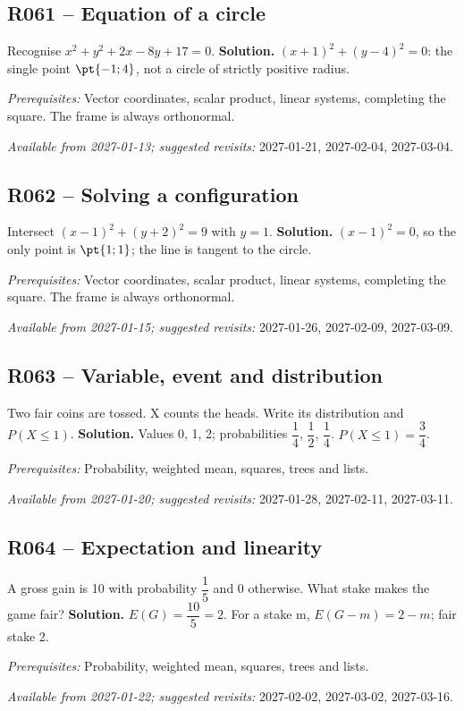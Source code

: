 \subsection*{R061 -- Equation of a circle}\label{R061}
Recognise $x^2+y^2+2x-8y+17=0$.
\ifmxteacher\textbf{Solution.} $(x+1)^2+(y-4)^2=0$: the single point $\pt{-1;4}$, not a circle of strictly positive radius.\par\textit{Prerequisites:} Vector coordinates, scalar product, linear systems, completing the square. The frame is always orthonormal.\par\textit{Available from 2027-01-13; suggested revisits:} 2027-01-21, 2027-02-04, 2027-03-04.\fi
{}\subsection*{R062 -- Solving a configuration}\label{R062}
Intersect $(x-1)^2+(y+2)^2=9$ with $y=1$.
\ifmxteacher\textbf{Solution.} $(x-1)^2=0$, so the only point is $\pt{1;1}$; the line is tangent to the circle.\par\textit{Prerequisites:} Vector coordinates, scalar product, linear systems, completing the square. The frame is always orthonormal.\par\textit{Available from 2027-01-15; suggested revisits:} 2027-01-26, 2027-02-09, 2027-03-09.\fi
{}\subsection*{R063 -- Variable, event and distribution}\label{R063}
Two fair coins are tossed. X counts the heads. Write its distribution and $P(X\leq1)$.
\ifmxteacher\textbf{Solution.} Values 0, 1, 2; probabilities $\dfrac{1}{4}$, $\dfrac{1}{2}$, $\dfrac{1}{4}$. $P(X\leq1)=\dfrac{3}{4}$.\par\textit{Prerequisites:} Probability, weighted mean, squares, trees and lists.\par\textit{Available from 2027-01-20; suggested revisits:} 2027-01-28, 2027-02-11, 2027-03-11.\fi
{}\subsection*{R064 -- Expectation and linearity}\label{R064}
A gross gain is 10 with probability $\dfrac{1}{5}$ and 0 otherwise. What stake makes the game fair?
\ifmxteacher\textbf{Solution.} $E(G)=\dfrac{10}{5}=2$. For a stake m, $E(G-m)=2-m$; fair stake 2.\par\textit{Prerequisites:} Probability, weighted mean, squares, trees and lists.\par\textit{Available from 2027-01-22; suggested revisits:} 2027-02-02, 2027-03-02, 2027-03-16.\fi
